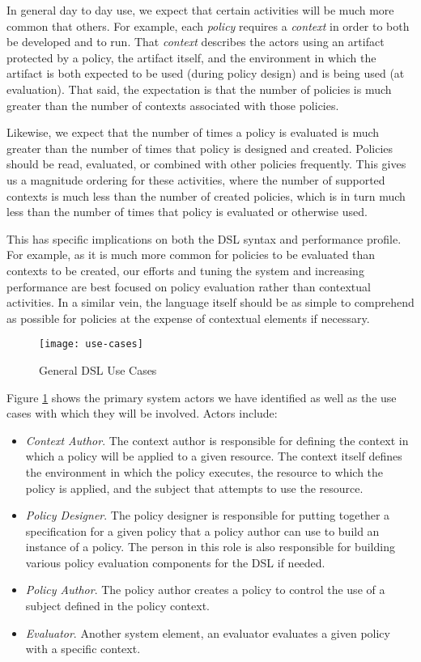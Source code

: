 In general day to day use, we expect that certain activities will be much more common that others.  For example, each \textit{policy} requires a \textit{context} in order to both be developed and to run.  That \textit{context} describes the actors using an artifact protected by a policy, the artifact itself, and the environment in which the artifact is both expected to be used (during policy design) and is being used (at evaluation).  That said, the expectation is that the number of policies is much greater than the number of contexts associated with those policies.

Likewise, we expect that the number of times a policy is evaluated is much greater than the number of times that policy is designed and created.  Policies should be read, evaluated, or combined with other policies frequently.  This gives us a magnitude ordering for these activities, where the number of supported contexts is much less than the number of created policies, which is in turn much less than the number of times that policy is evaluated or otherwise used.

This has specific implications on both the DSL syntax and performance profile.  For example, as it is much more common for policies to be evaluated than contexts to be created, our efforts and tuning the system and increasing performance are best focused on policy evaluation rather than contextual activities.  In a similar vein, the language itself should be as simple to comprehend as possible for policies at the expense of contextual elements if necessary.

\begin{figure}[!t]
\centering
\texttt{[image: use-cases]}
\caption{General DSL Use Cases}
\label{fig:model:use-cases}
\end{figure}

Figure \ref{fig:model:use-cases} shows the primary system actors we have identified as well as the use cases with which they will be involved.  Actors include:
\begin{itemize}
\item \textit{Context Author}.  The context author is responsible for defining the context in which a policy will be applied to a given resource.  The context itself defines the environment in which the policy executes, the resource to which the policy is applied, and the subject that attempts to use the resource.
\item \textit{Policy Designer}.  The policy designer is responsible for putting together a specification for a given policy that a policy author can use to build an instance of a policy.  The person in this role is also responsible for building various policy evaluation components for the DSL if needed.  
\item \textit{Policy Author}.  The policy author creates a policy to control the use of a subject defined in the policy context.
\item \textit{Evaluator}. Another system element, an evaluator evaluates a given policy with a specific context.
\end{itemize}


